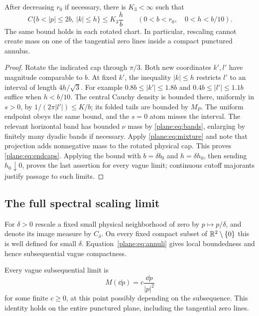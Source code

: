 \begin{lemma}[Endcaps]
\label{lem:endcaps}
After decreasing $r_0$ if necessary, there is $K_3<\infty$ such that
\begin{equation}
 \label{plane:eq:endcaps}
 C\{b<|p|\le2b,\ |k|\le h\}\le K_3\frac hb
 \qquad(0<b<r_0,\quad0<h<b/10).
\end{equation}
The same bound holds in each rotated chart.  In particular, rescaling
cannot create mass on one of the tangential zero lines inside a compact
punctured annulus.
\end{lemma}

\begin{proof}
Rotate the indicated cap through $\pi/3$.  Both new coordinates $k',l'$
have magnitude comparable to $b$.  At fixed $k'$, the inequality
$|k|\le h$ restricts $l'$ to an interval of length $4h/\sqrt3$.
For example $0.8b\le|k'|\le1.8b$ and
$0.4b\le|l'|\le1.1b$ suffice when $h<b/10$.
The central Cauchy density is bounded there, uniformly in $s>0$, by
$1/(2\pi|l'|)\le K/b$; its folded tails are bounded by $M_P$.
The uniform endpoint obeys the same bound, and the $s=0$ atom misses
the interval.  The relevant horizontal band has bounded $\nu$ mass
by \eqref{plane:eq:bands}, enlarging by finitely many dyadic bands
if necessary.  Apply \eqref{plane:eq:mixture} and note that projection
adds nonnegative mass to the rotated physical cap.  This proves
\eqref{plane:eq:endcaps}.  Applying the bound with $b=\delta b_0$
and $h=\delta h_0$, then sending $h_0\downarrow0$, proves the last
assertion for every vague limit; continuous cutoff majorants justify
passage to such limits.
\end{proof}

\subsection{The full spectral scaling limit}

For $\delta>0$ rescale a fixed small physical neighborhood of zero by
$p\mapsto p/\delta$, and denote its image measure by $C_\delta$.
On every fixed compact subset of $\mathbb R^2\setminus\{0\}$ this is
well defined for small $\delta$.  Equation~\eqref{plane:eq:annuli}
gives local boundedness and hence subsequential vague compactness.

\begin{lemma}
\label{plane:lem:subsequences}
Every vague subsequential limit is
\begin{equation}
 \label{plane:eq:subsequence}
 M(\dd p)=c\frac{\dd p}{|p|^2}
\end{equation}
for some finite $c\ge0$, at this point possibly depending on the
subsequence.  This identity holds on the entire punctured plane,
including the tangential zero lines.
\end{lemma}

